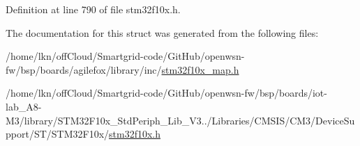 Definition at line 790 of file stm32f10x.\+h.



The documentation for this struct was generated from the following files\+:\begin{DoxyCompactItemize}
\item 
/home/lkn/off\+Cloud/\+Smartgrid-\/code/\+Git\+Hub/openwsn-\/fw/bsp/boards/agilefox/library/inc/\hyperlink{agilefox_2library_2inc_2stm32f10x__map_8h}{stm32f10x\+\_\+map.\+h}\item 
/home/lkn/off\+Cloud/\+Smartgrid-\/code/\+Git\+Hub/openwsn-\/fw/bsp/boards/iot-\/lab\+\_\+\+A8-\/\+M3/library/\+S\+T\+M32\+F10x\+\_\+\+Std\+Periph\+\_\+\+Lib\+\_\+\+V3../\+Libraries/\+C\+M\+S\+I\+S/\+C\+M3/\+Device\+Support/\+S\+T/\+S\+T\+M32\+F10x/\hyperlink{iot-lab___a8-_m3_2library_2_s_t_m32_f10x___std_periph___lib___v3_85_80_2_libraries_2_c_m_s_i_s_26497265545392eb5694b064ae15018db}{stm32f10x.\+h}\end{DoxyCompactItemize}

